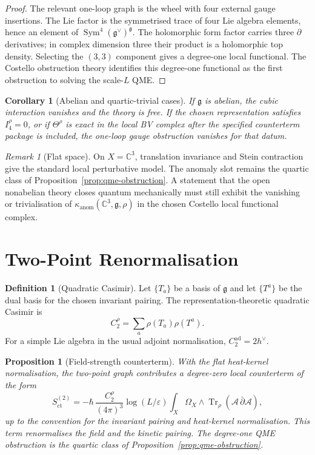 \documentclass[11pt]{amsart}
\providecommand{\C}{\mathbb{C}}
\providecommand{\dbar}{\bar{\partial}}
\providecommand{\fg}{\mathfrak{g}}
\providecommand{\ad}{\operatorname{ad}}
\providecommand{\Tr}{\operatorname{Tr}}
\providecommand{\Sym}{\operatorname{Sym}}
\providecommand{\cA}{\mathcal{A}}
\providecommand{\kanom}{\kappa_{\operatorname{anom}}}
\theoremstyle{plain}
\newtheorem{proposition}[theorem]{Proposition}
\newtheorem{corollary}[theorem]{Corollary}
\theoremstyle{definition}
\newtheorem{definition}[theorem]{Definition}
\theoremstyle{remark}
\newtheorem{remark}[theorem]{Remark}
\begin{document}
\begin{proof}
The relevant one-loop graph is the wheel with four external gauge
insertions.  The Lie factor is the symmetrised trace of four Lie
algebra elements, hence an element of $\Sym^4(\fg^\vee)^\fg$.  The
holomorphic form factor carries three $\partial$ derivatives; in
complex dimension three their product is a holomorphic top density.
Selecting the $(3,3)$ component gives a degree-one local functional.
The Costello obstruction theory identifies this degree-one functional
as the first obstruction to solving the scale-$L$ QME.
\end{proof}

\begin{corollary}[Abelian and quartic-trivial cases]
\label{cor:abelian-quartic-trivial}
If $\fg$ is abelian, the cubic interaction vanishes and the theory is
free.  If the chosen representation satisfies $I_4^\rho=0$, or if
$\Theta^\rho$ is exact in the local BV complex after the specified
counterterm package is included, the one-loop gauge obstruction
vanishes for that datum.
\end{corollary}

\begin{remark}[Flat space]
\label{rem:flat-space-obstruction}
On $X=\C^3$, translation invariance and Stein contraction give the
standard local perturbative model.  The anomaly slot remains the
quartic class of Proposition~\ref{prop:qme-obstruction}.  A statement
that the open nonabelian theory closes quantum mechanically must still
exhibit the vanishing or trivialisation of $\kanom(\C^3,\fg,\rho)$ in
the chosen Costello local functional complex.
\end{remark}

\section{Two-Point Renormalisation}
\label{sec:two-point-renormalisation}

\begin{definition}[Quadratic Casimir]
\label{def:quadratic-casimir}
Let $\{T_a\}$ be a basis of $\fg$ and let $\{T^a\}$ be the dual basis
for the chosen invariant pairing.  The representation-theoretic
quadratic Casimir is
\[
  C_2^\rho=\sum_a\rho(T_a)\rho(T^a).
\]
For a simple Lie algebra in the usual adjoint normalisation,
$C_2^{\ad}=2h^\vee$.
\end{definition}

\begin{proposition}[Field-strength counterterm]
\label{prop:field-strength}
With the flat heat-kernel normalisation, the two-point graph contributes
a degree-zero local counterterm of the form
\[
  S_{\mathrm{ct}}^{(2)}
  =
  -\hbar\,\frac{C_2^\rho}{(4\pi)^3}
  \log(L/\varepsilon)
  \int_X\Omega_X\wedge\Tr_\rho(\cA\,\dbar\cA),
\]
up to the convention for the invariant pairing and heat-kernel
normalisation.  This term renormalises the field and the kinetic
pairing.  The degree-one QME obstruction is the quartic class of
Proposition~\ref{prop:qme-obstruction}.
\end{proposition}
\end{document}
